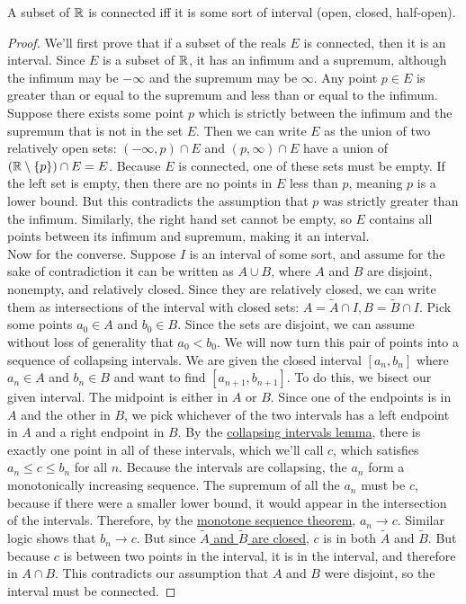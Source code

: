 \begin{lemma}
A subset of $\mathbb{R}$ is connected iff it is some sort of interval (open, closed, half-open).
\end{lemma}
\begin{proof}
We'll first prove that if a subset of the reals $E$ is connected, then it is an interval. Since $E$ is a subset of $\mathbb{R}$, it has an infimum and a supremum, although the infimum may be $-\infty$ and the supremum may be $\infty$. Any point $p \in E$ is greater than or equal to the supremum and less than or equal to the infimum. Suppose there exists some point $p$ which is strictly between the infimum and the supremum that is not in the set $E$. Then we can write $E$ as the union of two relatively open sets: $(-\infty, p) \cap E$ and $(p, \infty) \cap E$ have a union of $(\mathbb{R} \setminus \{p\}) \cap E = E$. Because $E$ is connected, one of these sets must be empty. If the left set is empty, then there are no points in $E$ less than $p$, meaning $p$ is a lower bound. But this contradicts the assumption that $p$ was strictly greater than the infimum. Similarly, the right hand set cannot be empty, so $E$ contains all points between its infimum and supremum, making it an interval.\\
Now for the converse. Suppose $I$ is an interval of some sort, and assume for the sake of contradiction it can be written as $A \cup B$, where $A$ and $B$ are disjoint, nonempty, and relatively closed. Since they are relatively closed, we can write them as intersections of the interval with closed sets: $A = \tilde{A} \cap I, B = \tilde{B} \cap I$. Pick some points $a_0 \in A$ and $b_0 \in B$. Since the sets are disjoint, we can assume without loss of generality that $a_0 < b_0$. We will now turn this pair of points into a sequence of collapsing intervals. We are given the closed interval $[a_n, b_n]$ where $a_n \in A$ and $b_n \in B$ and want to find $[a_{n+1}, b_{n+1}]$. To do this, we bisect our given interval. The midpoint is either in $A$ or $B$. Since one of the endpoints is in $A$ and the other in $B$, we pick whichever of the two intervals has a left endpoint in $A$ and a right endpoint in $B$. By the \hyperlink{Collapsing Intervals Lemma}{collapsing intervals lemma}, there is exactly one point in all of these intervals, which we'll call $c$, which satisfies $a_n \leq c \leq b_n$ for all $n$. Because the intervals are collapsing, the $a_n$ form a monotonically increasing sequence. The supremum of all the $a_n$ must be $c$, because if there were a smaller lower bound, it would appear in the intersection of the intervals. Therefore, by the \hyperlink{Monotone Sequence Theorem}{monotone sequence theorem}, $a_n \to c$. Similar logic shows that $b_n \to c$. But since \hyperlink{Sequences and Accumulation Points}{$\tilde{A}$ and $\tilde{B}$ are closed}, $c$ is in both $\tilde{A}$ and $\tilde{B}$. But because $c$ is between two points in the interval, it is in the interval, and therefore in $A\cap B$. This contradicts our assumption that $A$ and $B$ were disjoint, so the interval must be connected. 
\end{proof}
